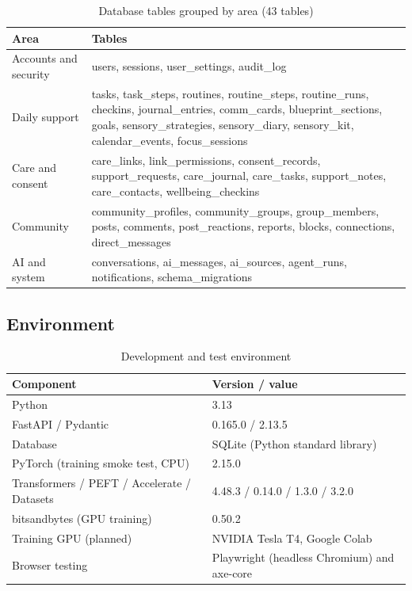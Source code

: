 \documentclass[11pt,a4paper]{article}
\begin{document}
\begin{table}[H]
\centering
\caption{Database tables grouped by area (43 tables)}
\label{tab:tables}
\small
\begin{tabularx}{\textwidth}{@{}L{3.2cm}Y@{}}
\toprule
\textbf{Area} & \textbf{Tables}\\
\midrule
Accounts and security & users, sessions, user\_settings, audit\_log\\
Daily support & tasks, task\_steps, routines, routine\_steps, routine\_runs, checkins, journal\_entries, comm\_cards, blueprint\_sections, goals, sensory\_strategies, sensory\_diary, sensory\_kit, calendar\_events, focus\_sessions\\
Care and consent & care\_links, link\_permissions, consent\_records, support\_requests, care\_journal, care\_tasks, support\_notes, care\_contacts, wellbeing\_checkins\\
Community & community\_profiles, community\_groups, group\_members, posts, comments, post\_reactions, reports, blocks, connections, direct\_messages\\
AI and system & conversations, ai\_messages, ai\_sources, agent\_runs, notifications, schema\_migrations\\
\bottomrule
\end{tabularx}
\end{table}

\subsection{Environment}
\begin{table}[H]
\centering
\caption{Development and test environment}
\label{tab:env}
\small
\begin{tabular}{@{}ll@{}}
\toprule
\textbf{Component} & \textbf{Version / value}\\
\midrule
Python & 3.13\\
FastAPI / Pydantic & 0.165.0 / 2.13.5\\
Database & SQLite (Python standard library)\\
PyTorch (training smoke test, CPU) & 2.15.0\\
Transformers / PEFT / Accelerate / Datasets & 4.48.3 / 0.14.0 / 1.3.0 / 3.2.0\\
bitsandbytes (GPU training) & 0.50.2\\
Training GPU (planned) & NVIDIA Tesla T4, Google Colab\\
Browser testing & Playwright (headless Chromium) and axe-core\\
\bottomrule
\end{tabular}
\end{table}
\end{document}
